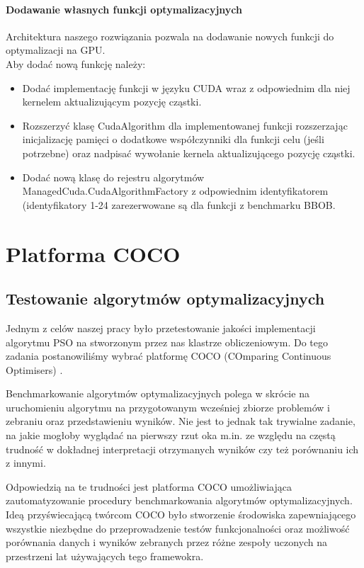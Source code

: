 \documentclass[12pt, twoside, openany, abstract=on]{report}
\theoremstyle{definition}
\begin{document}
\subsubsection{Dodawanie własnych funkcji optymalizacyjnych}
Architektura naszego rozwiązania pozwala na dodawanie nowych funkcji do optymalizacji na GPU. \\

Aby dodać nową funkcję należy:
\begin{itemize}
\item Dodać implementację funkcji w języku CUDA wraz z odpowiednim dla niej kernelem aktualizującym pozycję cząstki.
\item Rozszerzyć klasę CudaAlgorithm dla implementowanej funkcji rozszerzając inicjalizację pamięci o dodatkowe współczynniki dla funkcji celu (jeśli potrzebne) oraz nadpisać wywołanie kernela aktualizującego pozycję cząstki.
\item Dodać nową klasę do rejestru algorytmów ManagedCuda.CudaAlgorithmFactory z odpowiednim identyfikatorem (identyfikatory 1-24 zarezerwowane są dla funkcji z benchmarku BBOB.
\end{itemize}
 
 
\chapter{Platforma COCO}

\section{Testowanie algorytmów optymalizacyjnych}
Jednym z celów naszej pracy było przetestowanie jakości implementacji algorytmu PSO na stworzonym przez nas klastrze obliczeniowym. Do tego zadania postanowiliśmy wybrać platformę COCO (COmparing Continuous Optimisers) \cite{Coco}.

Benchmarkowanie algorytmów optymalizacyjnych polega w skrócie na uruchomieniu algorytmu na przygotowanym wcześniej zbiorze problemów i zebraniu oraz przedstawieniu wyników. Nie jest to jednak tak trywialne zadanie, na jakie mogłoby wyglądać na pierwszy rzut oka m.in. ze względu na częstą trudność w dokładnej interpretacji otrzymanych wyników czy też porównaniu ich z innymi.

Odpowiedzią na te trudności jest platforma COCO umożliwiająca zautomatyzowanie procedury benchmarkowania algorytmów optymalizacyjnych. Ideą przyświecającą twórcom COCO było stworzenie środowiska zapewniającego wszystkie niezbędne do przeprowadzenie testów funkcjonalności oraz możliwość porównania danych i wyników zebranych przez różne zespoły uczonych na przestrzeni lat używających tego framewokra. 
\end{document}
